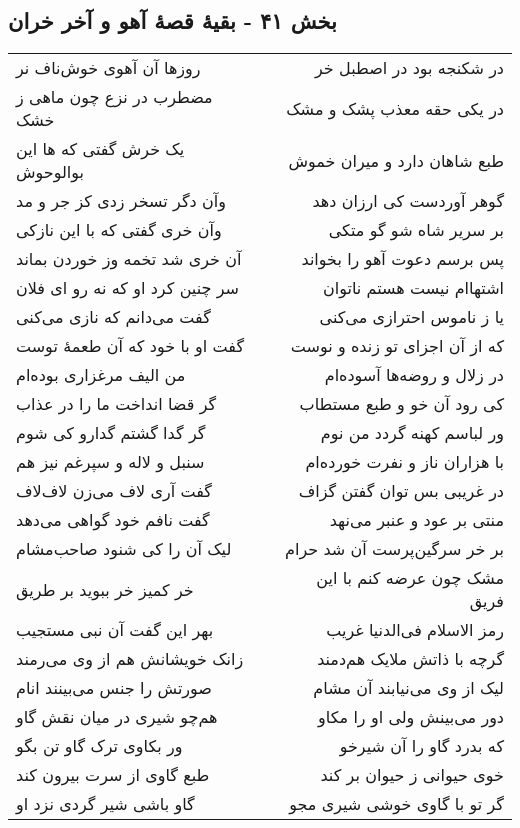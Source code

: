 \begin{center}
\section*{بخش ۴۱ - بقیهٔ قصهٔ آهو و آخر خران}
\label{sec:sh041}
\begin{longtable}{l p{0.5cm} r}
روزها آن آهوی خوش‌ناف نر
&&
در شکنجه بود در اصطبل خر
\\
مضطرب در نزع چون ماهی ز خشک
&&
در یکی حقه معذب پشک و مشک
\\
یک خرش گفتی که ها این بوالوحوش
&&
طبع شاهان دارد و میران خموش
\\
وآن دگر تسخر زدی کز جر و مد
&&
گوهر آوردست کی ارزان دهد
\\
وآن خری گفتی که با این نازکی
&&
بر سریر شاه شو گو متکی
\\
آن خری شد تخمه وز خوردن بماند
&&
پس برسم دعوت آهو را بخواند
\\
سر چنین کرد او که نه رو ای فلان
&&
اشتهاام نیست هستم ناتوان
\\
گفت می‌دانم که نازی می‌کنی
&&
یا ز ناموس احترازی می‌کنی
\\
گفت او با خود که آن طعمهٔ توست
&&
که از آن اجزای تو زنده و نوست
\\
من الیف مرغزاری بوده‌ام
&&
در زلال و روضه‌ها آسوده‌ام
\\
گر قضا انداخت ما را در عذاب
&&
کی رود آن خو و طبع مستطاب
\\
گر گدا گشتم گدارو کی شوم
&&
ور لباسم کهنه گردد من نوم
\\
سنبل و لاله و سپرغم نیز هم
&&
با هزاران ناز و نفرت خورده‌ام
\\
گفت آری لاف می‌زن لاف‌لاف
&&
در غریبی بس توان گفتن گزاف
\\
گفت نافم خود گواهی می‌دهد
&&
منتی بر عود و عنبر می‌نهد
\\
لیک آن را کی شنود صاحب‌مشام
&&
بر خر سرگین‌پرست آن شد حرام
\\
خر کمیز خر ببوید بر طریق
&&
مشک چون عرضه کنم با این فریق
\\
بهر این گفت آن نبی مستجیب
&&
رمز الاسلام فی‌الدنیا غریب
\\
زانک خویشانش هم از وی می‌رمند
&&
گرچه با ذاتش ملایک هم‌دمند
\\
صورتش را جنس می‌بینند انام
&&
لیک از وی می‌نیابند آن مشام
\\
هم‌چو شیری در میان نقش گاو
&&
دور می‌بینش ولی او را مکاو
\\
ور بکاوی ترک گاو تن بگو
&&
که بدرد گاو را آن شیرخو
\\
طبع گاوی از سرت بیرون کند
&&
خوی حیوانی ز حیوان بر کند
\\
گاو باشی شیر گردی نزد او
&&
گر تو با گاوی خوشی شیری مجو
\\
\end{longtable}
\end{center}
